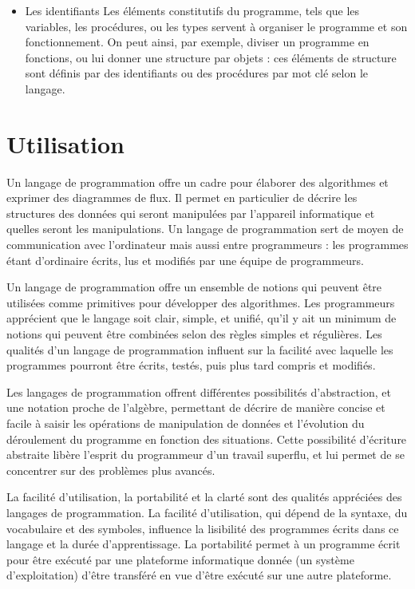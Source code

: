 \documentclass[a4paper,12pt]{article}
\begin{document}
\begin{itemize}[label=\textbullet]
\item Les identifiants
\newline Les éléments constitutifs du programme, tels que les variables, les procédures, ou les types servent à organiser le programme et son fonctionnement. On peut ainsi, par exemple, diviser un programme en fonctions, ou lui donner une structure par objets : ces éléments de structure sont définis par des identifiants ou des procédures par mot clé selon le langage.

\end{itemize}

\section{Utilisation}

Un langage de programmation offre un cadre pour élaborer des algorithmes et exprimer des diagrammes de flux\cite{itl}\cite{seema}. Il permet en particulier de décrire les structures des données qui seront manipulées par l'appareil informatique et quelles seront les manipulations. Un langage de programmation sert de moyen de communication avec l'ordinateur mais aussi entre programmeurs : les programmes étant d'ordinaire écrits, lus et modifiés par une équipe de programmeurs\cite{william}.

Un langage de programmation offre un ensemble de notions qui peuvent être utilisées comme primitives pour développer des algorithmes. Les programmeurs apprécient que le langage soit clair, simple, et unifié, qu'il y ait un minimum de notions qui peuvent être combinées selon des règles simples et régulières. Les qualités d'un langage de programmation influent sur la facilité avec laquelle les programmes pourront être écrits, testés, puis plus tard compris et modifiés\cite{seema}.

Les langages de programmation offrent différentes possibilités d'abstraction, et une notation proche de l'algèbre, permettant de décrire de manière concise et facile à saisir les opérations de manipulation de données et l'évolution du déroulement du programme en fonction des situations. Cette possibilité d'écriture abstraite libère l'esprit du programmeur d'un travail superflu, et lui permet de se concentrer sur des problèmes plus avancés\cite{kenneth}.

La facilité d'utilisation, la portabilité et la clarté sont des qualités appréciées des langages de programmation. La facilité d'utilisation, qui dépend de la syntaxe, du vocabulaire et des symboles, influence la lisibilité des programmes écrits dans ce langage et la durée d'apprentissage. La portabilité permet à un programme écrit pour être exécuté par une plateforme informatique donnée (un système d'exploitation) d'être transféré en vue d'être exécuté sur une autre plateforme\cite{itl}.
\end{document}
